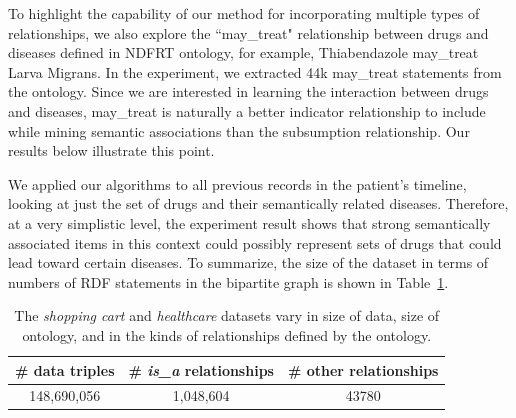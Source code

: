 To highlight the capability of our method for incorporating multiple types of relationships, we also explore the ``may\_treat" relationship between drugs and diseases defined in NDFRT ontology, for example, Thiabendazole may\_treat Larva Migrans. In the experiment, we extracted 44k may\_treat statements from the ontology. Since we are interested in learning the interaction between drugs and diseases, may\_treat is naturally a better indicator relationship to include while mining semantic associations than the subsumption relationship. Our results below illustrate this point.

We applied our algorithms to all previous records in the patient's timeline, looking at just the set of drugs and their semantically related diseases. Therefore, at a very simplistic level, the experiment result shows that strong semantically associated items in this context could possibly represent sets of drugs that could lead toward certain diseases. To summarize, the size of the dataset in terms of numbers of RDF statements in the bipartite graph is shown in Table~\ref{tbl:exp_overview}.


\begin{table}[tbh]\scriptsize
\begin{center}
\begin{tabular}{c|c|c}
\hline
  \# data triples & \# \emph{is\_a} relationships & \# other relationships \\
  \hline
  148,690,056  & 1,048,604 &    43780\\
  \hline
\end{tabular}
\end{center}
\caption{\label{tbl:exp_overview} The \emph{shopping cart} and \emph{healthcare} datasets vary in size of data, size of ontology, and in the kinds of relationships defined by the ontology.}
\end{table}


